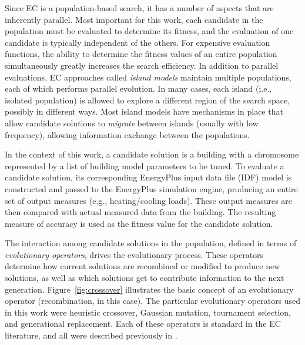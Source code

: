 \documentclass[preprint, review, 12pt]{elsarticle}
\begin{document}
Since EC is a population-based search, it has a number of aspects that are inherently parallel. Most important for this work, each candidate in the population must be evaluated to determine its fitness, and the evaluation of one candidate is typically independent of the others. For expensive evaluation functions, the ability to determine the fitness values of an entire population simultaneously greatly increases the search efficiency. In addition to parallel evaluations, EC approaches called \emph{island models} \cite{cit:eiben2007} maintain multiple populations, each of which performs parallel evolution. In many cases, each island (i.e., isolated population) is allowed to explore a different region of the search space, possibly in different ways. Most island models have mechanisms in place that allow candidate solutions to \emph{migrate} between islands (usually with low frequency), allowing information exchange between the populations.

In the context of this work, a candidate solution is a building with a chromosome represented by a list of building model parameters to be tuned. To evaluate a candidate solution, its corresponding EnergyPlus input data file (IDF) model is constructed and passed to the EnergyPlus simulation engine, producing an entire set of output measures (e.g., heating/cooling loads). These output measures are then compared with actual measured data from the building. The resulting measure of accuracy is used as the fitness value for the candidate solution. 

The interaction among candidate solutions in the population, defined in terms of \emph{evolutionary operators}, drives the evolutionary process. These operators determine how current solutions are recombined or modified to produce new solutions, as well as which solutions get to contribute information to the next generation. Figure~\ref{fig:crossover} illustrates the basic concept of an evolutionary operator (recombination, in this case). The particular evolutionary operators used in this work were heuristic crossover, Gaussian mutation, tournament selection, and generational replacement. Each of these operators is standard in the EC literature, and all were described previously in \cite{cit:garrett2013}.
\end{document}
